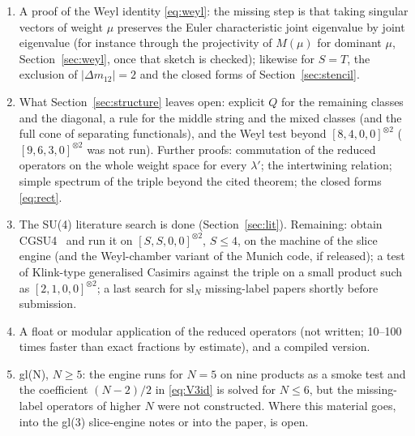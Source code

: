 \documentclass[11pt]{article}
\makeatletter
\renewcommand\section{\@startsection{section}{1}{\z@}{-2.6ex \@plus -1ex \@minus -.2ex}{1.0ex \@plus .2ex}{\normalfont\large\bfseries}}
\makeatother
\begin{document}
\begin{enumerate}\small
\item A proof of the Weyl identity \eqref{eq:weyl}: the missing step is that taking singular vectors of weight $\mu$ preserves the Euler characteristic joint eigenvalue by joint eigenvalue (for instance through the projectivity of $M(\mu)$ for dominant $\mu$, Section~\ref{sec:weyl}, once that sketch is checked); likewise for $S=T$, the exclusion of $|\Delta m_{12}|=2$ and the closed forms of Section~\ref{sec:stencil}.
\item What Section~\ref{sec:structure} leaves open: explicit $Q$ for the remaining classes and the diagonal, a rule for the middle string and the mixed classes (and the full cone of separating functionals), and the Weyl test beyond $[8,4,0,0]^{\otimes2}$ ($[9,6,3,0]^{\otimes2}$ was not run).
Further proofs: commutation of the reduced operators on the whole weight space for every $\lambda'$; the intertwining relation; simple spectrum of the triple beyond the cited theorem; the closed forms \eqref{eq:rect}.
\item The SU(4) literature search is done (Section~\ref{sec:lit}).
Remaining: obtain CGSU4~\cite{cgsu4} and run it on $[S,S,0,0]^{\otimes2}$, $S\le4$, on the machine of the slice engine (and the Weyl-chamber variant of the Munich code, if released); a test of Klink-type generalised Casimirs against the triple on a small product such as $[2,1,0,0]^{\otimes2}$; a last search for $\mathrm{sl}_N$ missing-label papers shortly before submission.
\item A float or modular application of the reduced operators (not written; 10--100 times faster than exact fractions by estimate), and a compiled version.
\item gl(N), $N\ge5$: the engine runs for $N=5$ on nine products as a smoke test and the coefficient $(N-2)/2$ in \eqref{eq:V3id} is solved for $N\le6$, but the missing-label operators of higher $N$ were not constructed.
Where this material goes, into the gl(3) slice-engine notes or into the paper, is open.
\end{enumerate}

\appendix
\section{Conventions}\label{app:conv}
\end{document}
